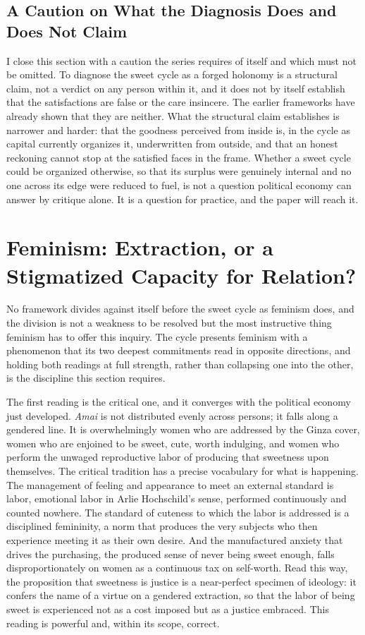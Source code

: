 \documentclass[11pt,a4paper]{article}
\begin{document}
\subsection{A Caution on What the Diagnosis Does and Does Not Claim}

I close this section with a caution the series requires of itself and which must not be omitted. To diagnose the sweet cycle as a forged holonomy is a structural claim, not a verdict on any person within it, and it does not by itself establish that the satisfactions are false or the care insincere. The earlier frameworks have already shown that they are neither. What the structural claim establishes is narrower and harder: that the goodness perceived from inside is, in the cycle as capital currently organizes it, underwritten from outside, and that an honest reckoning cannot stop at the satisfied faces in the frame. Whether a sweet cycle could be organized otherwise, so that its surplus were genuinely internal and no one across its edge were reduced to fuel, is not a question political economy can answer by critique alone. It is a question for practice, and the paper will reach it.

\section{Feminism: Extraction, or a Stigmatized Capacity for Relation?}

No framework divides against itself before the sweet cycle as feminism does, and the division is not a weakness to be resolved but the most instructive thing feminism has to offer this inquiry. The cycle presents feminism with a phenomenon that its two deepest commitments read in opposite directions, and holding both readings at full strength, rather than collapsing one into the other, is the discipline this section requires.

The first reading is the critical one, and it converges with the political economy just developed. \textit{Amai} is not distributed evenly across persons; it falls along a gendered line. It is overwhelmingly women who are addressed by the Ginza cover, women who are enjoined to be sweet, cute, worth indulging, and women who perform the unwaged reproductive labor of producing that sweetness upon themselves. The critical tradition has a precise vocabulary for what is happening. The management of feeling and appearance to meet an external standard is labor, emotional labor in Arlie Hochschild's sense, performed continuously and counted nowhere. The standard of cuteness to which the labor is addressed is a disciplined femininity, a norm that produces the very subjects who then experience meeting it as their own desire. And the manufactured anxiety that drives the purchasing, the produced sense of never being sweet enough, falls disproportionately on women as a continuous tax on self-worth. Read this way, the proposition that sweetness is justice is a near-perfect specimen of ideology: it confers the name of a virtue on a gendered extraction, so that the labor of being sweet is experienced not as a cost imposed but as a justice embraced. This reading is powerful and, within its scope, correct.
\end{document}
